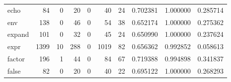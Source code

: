 \begin{longtable}{lrrrrrrrrr}
echo      &                                                 84 &                                                  0 &                                                 20 &                                                  0 &                                                 40 &                                                 24 &                                           0.702381 &                               1.000000 &                             0.285714 \\
env       &                                                138 &                                                  0 &                                                 46 &                                                  0 &                                                 54 &                                                 38 &                                           0.652174 &                               1.000000 &                             0.275362 \\
expand    &                                                101 &                                                  0 &                                                 32 &                                                  0 &                                                 45 &                                                 24 &                                           0.650990 &                               1.000000 &                             0.237624 \\
expr      &                                               1399 &                                                 10 &                                                288 &                                                  0 &                                               1019 &                                                 82 &                                           0.656362 &                               0.992852 &                             0.058613 \\
factor    &                                                196 &                                                  1 &                                                 44 &                                                  0 &                                                 84 &                                                 67 &                                           0.719388 &                               0.994898 &                             0.341837 \\
false     &                                                 82 &                                                  0 &                                                 20 &                                                  0 &                                                 40 &                                                 22 &                                           0.695122 &                               1.000000 &                             0.268293 \\

\end{longtable}
